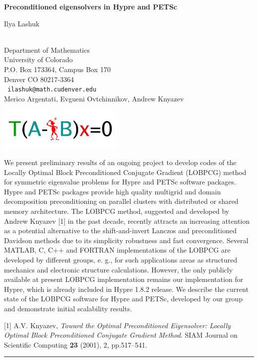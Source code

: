 \documentclass[twosided]{report}
\begin{document}
\begin{center}
{\large			\label{lashuk}
{\bf Preconditioned eigensolvers in Hypre and PETSc}

Ilya Lashuk} \\
Department of Mathematics \\
University of Colorado \\
P.O. Box 173364, Campus Box 170 \\
Denver CO 80217-3364
\\ {\tt
ilashuk@math.cudenver.edu
}
\\
Merico Argentati,
Evgueni Ovtchinnikov,
Andrew Knyazev

\includegraphics[width=60mm]{lashuk}
\end{center}

We present preliminary results of an ongoing project to develop codes
of the Locally Optimal Block Preconditioned Conjugate Gradient (LOBPCG)
method for symmetric eigenvalue problems for Hypre and PETSc software
packages. Hypre and PETSc packages provide high quality multigrid and
domain decomposition preconditioning on parallel clusters with
distributed or shared memory architecture. The LOBPCG method, suggested
and developed by Andrew Knyazev [1] in the past decade, recently
attracts an increasing attention as a potential alternative to the
shift-and-invert Lanczos and preconditioned Davidson methods due to its
simplicity robustness and fast convergence. Several MATLAB, C, C++ and
FORTRAN implementations of the LOBPCG are developed by different
groups, e. g., for such applications areas as structured mechanics and
electronic structure calculations. However, the only publicly available
at present LOBPCG implementation remains our implementation for Hypre,
which is already included in Hypre 1.8.2 release. We describe the
current state of the LOBPCG software for Hypre and PETSc, developed by
our group and demonstrate initial scalability results.

[1] A.V. Knyazev, {\em Toward the Optimal Preconditioned Eigensolver:
Locally Optimal Block Preconditioned Conjugate Gradient Method}.
SIAM Journal on Scientific Computing {\bf 23} (2001), 2, pp.517--541.


\begin{center} \rule{6in}{1pt} \end{center}
\newpage
\end{document}

